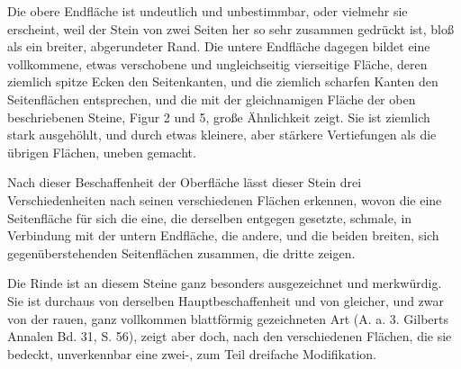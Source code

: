 \documentclass[a4paper, 11pt, oneside, german]{article}
\begin{document}
Die obere Endfläche ist undeutlich und unbestimmbar, oder vielmehr sie erscheint, weil der Stein von zwei Seiten her so sehr zusammen gedrückt ist, bloß als ein breiter, abgerundeter Rand. Die untere Endfläche dagegen bildet eine vollkommene, etwas verschobene und ungleichseitig vierseitige Fläche, deren ziemlich spitze Ecken den Seitenkanten, und die ziemlich scharfen Kanten den Seitenflächen entsprechen, und die mit der gleichnamigen Fläche der oben beschriebenen Steine, Figur 2 und 5, große Ähnlichkeit zeigt. Sie ist ziemlich stark ausgehöhlt, und durch etwas kleinere, aber stärkere Vertiefungen als die übrigen Flächen, uneben gemacht.

Nach dieser Beschaffenheit der Oberfläche lässt dieser Stein drei Verschiedenheiten nach seinen verschiedenen Flächen erkennen, wovon die eine Seitenfläche für sich die eine, die derselben entgegen gesetzte, schmale, in Verbindung mit der untern Endfläche, die andere, und die beiden breiten, sich gegenüberstehenden Seitenflächen zusammen, die dritte zeigen.

Die Rinde ist an diesem Steine ganz besonders ausgezeichnet und merkwürdig. Sie ist durchaus von derselben Hauptbeschaffenheit und von gleicher, und zwar von der rauen, ganz vollkommen blattförmig gezeichneten Art (A. a. 3. Gilberts Annalen Bd. 31, S. 56), zeigt aber doch, nach den verschiedenen Flächen, die sie bedeckt, unverkennbar eine zwei-, zum Teil dreifache Modifikation.
\end{document}
